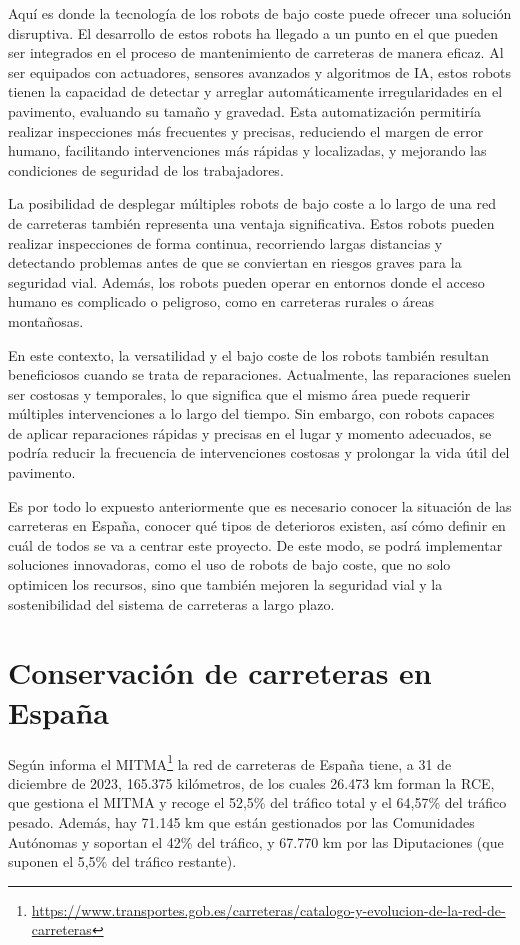 Aquí es donde la tecnología de los robots de bajo coste puede ofrecer una solución disruptiva. El desarrollo de estos robots ha llegado a un punto en el que pueden ser integrados en el proceso de mantenimiento de carreteras de manera eficaz. Al ser equipados con actuadores, sensores avanzados y algoritmos de \ac{IA}, estos robots tienen la capacidad de detectar y arreglar automáticamente irregularidades en el pavimento, evaluando su tamaño y gravedad. Esta automatización permitiría realizar inspecciones más frecuentes y precisas, reduciendo el margen de error humano, facilitando intervenciones más rápidas y localizadas, y mejorando las condiciones de seguridad de los trabajadores.

La posibilidad de desplegar múltiples robots de bajo coste a lo largo de una red de carreteras también representa una ventaja significativa. Estos robots pueden realizar inspecciones de forma continua, recorriendo largas distancias y detectando problemas antes de que se conviertan en riesgos graves para la seguridad vial. Además, los robots pueden operar en entornos donde el acceso humano es complicado o peligroso, como en carreteras rurales o áreas montañosas.

En este contexto, la versatilidad y el bajo coste de los robots también resultan beneficiosos cuando se trata de reparaciones. Actualmente, las reparaciones suelen ser costosas y temporales, lo que significa que el mismo área puede requerir múltiples intervenciones a lo largo del tiempo. Sin embargo, con robots capaces de aplicar reparaciones rápidas y precisas en el lugar y momento adecuados, se podría reducir la frecuencia de intervenciones costosas y prolongar la vida útil del pavimento. 

Es por todo lo expuesto anteriormente que es necesario conocer la situación de las carreteras en España, conocer qué tipos de deterioros existen, así cómo definir en cuál de todos se va a centrar este proyecto. De este modo, se podrá implementar soluciones innovadoras, como el uso de robots de bajo coste, que no solo optimicen los recursos, sino que también mejoren la seguridad vial y la sostenibilidad del sistema de carreteras a largo plazo.


\section{Conservación de carreteras en España}

Según informa el \ac{MITMA}\footnote{\url{https://www.transportes.gob.es/carreteras/catalogo-y-evolucion-de-la-red-de-carreteras}} la red de carreteras de España tiene, a 31 de diciembre de 2023, 165.375 kilómetros, de los cuales 26.473 km forman la \ac{RCE}, que gestiona el \acs{MITMA} y recoge el 52,5\% del tráfico total y el 64,57\% del tráfico pesado. Además, hay 71.145 km que están gestionados por las Comunidades Autónomas y soportan el 42\% del tráfico, y 67.770 km por las Diputaciones (que suponen el 5,5\% del tráfico restante).

